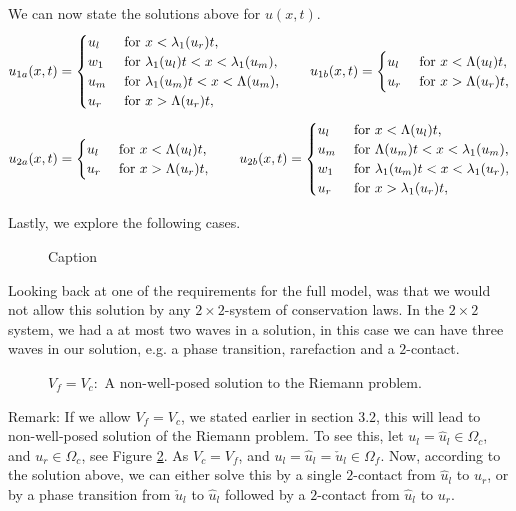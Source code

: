 \documentclass[10pt]{article}
\numberwithin{equation}{section}
\begin{document}
We can now state the solutions above for $u(x,t)$.
\begin{align}
    u_{1a}(x,t) = \begin{cases}
        u_l & \text{ for $ x < \lambda_1(u_r)t$}, \\
         w_1 &\text{ for $  \lambda_1(u_l)t < x < \lambda_1(u_m)$}, \\
        u_m & \text{ for $  \lambda_1(u_m)t < x < \Lambda(u_m)$}, \\
        u_r & \text{ for $x > \Lambda(u_r)t$},
    \end{cases} 
    \quad \quad 
    u_{1b}(x,t) = \begin{cases}
        u_l & \text{ for $ x < \Lambda(u_l)t$}, \\
        u_r & \text{ for $x > \Lambda( u_r)t$},
    \end{cases} 
    \label{Eq:Sol1}
\end{align}
\begin{align}
    u_{2a}(x,t) = \begin{cases}
        u_l & \text{ for $ x < \Lambda(u_l)t$}, \\
        u_r & \text{ for $x > \Lambda( u_r)t$},
    \end{cases} 
    \quad \quad 
    u_{2b}(x,t) = \begin{cases}
        u_l & \text{ for $ x < \Lambda(u_l)t$}, \\
        u_m & \text{ for $  \Lambda(u_m)t < x < \lambda_1(u_m)$}, \\
        w_1 &\text{ for $  \lambda_1(u_m)t < x < \lambda_1(u_r)$}, \\
        u_r & \text{ for $x > \lambda_1( u_r)t$},
    \end{cases} 
    \label{Eq:Sol2}
\end{align}

Lastly, we explore the following cases.
\begin{figure}
    \centering
    
    \caption{Caption}
    \label{fig:my_label}
\end{figure}

\newpage
Looking back at one of the requirements for the full model, was that we would not allow this solution by any $2 \times 2$-system of conservation laws. In the $2 \times 2$ system, we had a at most two waves in a solution, in this case we can have three waves in our solution, e.g. a phase transition, rarefaction and a $2$-contact. 
\begin{figure}
   
   \caption{$V_f = V_c:$ A non-well-posed solution to the Riemann problem.}
   \label{Fig:NotWellPosed}
\end{figure}
Remark: If we allow $V_f = V_c$, we stated earlier in section $3.2$, this will lead to non-well-posed solution of the Riemann problem. To see this, let $u_l = \hat u_l \in \Omega_c$, and $u_r \in \Omega_c$, see Figure \ref{Fig:NotWellPosed}. As $V_c = V_f$, and  $u_l = \hat u_l = \check u_l \in \Omega_f$. Now, according to the solution above, we can either solve this by a single $2$-contact from $\hat u_l$ to $u_r$, or by a phase transition from $\check u_l$ to $\hat u_l$ followed by a $2$-contact from $\hat u_l$ to $u_r$.
\end{document}
